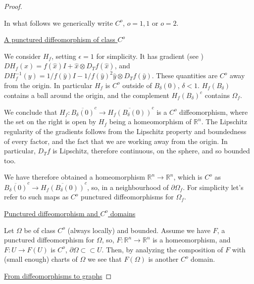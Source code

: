 \documentclass[english,a4paper,9pt,oneside]{scrbook}	%
\theoremstyle{break}
\newenvironment{mproof}[1][\proofname]{%
  \begin{proof}[#1]$ $\par\nobreak\ignorespaces
}{%
  \end{proof}
}
\renewcommand*{\proofname}{Proof}
\theoremstyle{remark}
\newcommand{\mR}{\mathbb{R}}
\newcommand{\cc}{\subset\subset}
\newcommand{\xh}{\hat{x}}
\newcommand{\yh}{\hat{y}}
\newcommand{\eps}{\epsilon}
\begin{document}
\begin{mproof}

In what follows we generically write $ C^o$, $o=1,1 $ or $o=2$.


\underline{A punctured diffeomorphism of class $C^o$}

We consider $H_f$, setting $\eps=1$ for simplicity. It has gradient (see \cite{deckelnick}) $D H_f(x) = f(\xh)I+\xh \otimes D_Tf(\xh)$, and  $D H_f^{-1}(y) =1/f(\yh)I-1/f(\yh)^2 \yh \otimes D_Tf(\yh)$. These quantities are $C^o$ away from the origin. In particular $H_f$ is $C^o$  outside of $B_\delta(0)$, $\delta < 1$. $H_f(B_\delta)$ contains a ball around the origin, and the complement $H_f(B_\delta)^c$ contains $\Omega_f$.

We conclude that $H_f: \overline{B_\delta(0)}^c \rightarrow \overline{H_f(B_\delta(0))}^c$ is a $C^o$ diffeomorphism, where the set on the right is open by $H_f$ being a homeomorphism of $\mR^n$. The Lipschitz regularity of the gradients follows from the Lipschitz property and boundedness of every factor, and the fact that we are working away from the origin. In particular, $D_T f$ is Lipschitz, therefore continuous, on the sphere, and so bounded too.

We have therefore obtained a homeomorphism $\mR^n \rightarrow \mR^n$, which is $C^o$ as $\overline{B_\delta(0)}^c \rightarrow \overline{H_f(B_\delta(0))}^c$, so, in a neighbourhood of $\partial \Omega_f$.
For simplicity let's refer to such maps as $C^o$ punctured diffeomorphisms for $\Omega_f$.

\underline{Punctured diffeomorphism and $C^o$ domains}

Let $\Omega$ be of class $C^o$ (always locally) and bounded. Assume we have $F$, a punctured diffeomorphism for $\Omega$, so, $F:\mR^n\rightarrow \mR^n$ is a homeomorphism, and $F: U\rightarrow F(U)$ is $C^o$, $\partial \Omega \cc U$. Then, by analyzing the composition of $F$ with (small enough) charts of $\Omega$ we see that $F(\Omega)$ is another $C^o$ domain. 

\underline{From diffeomorphisms to graphs}


\end{mproof}
\end{document}
